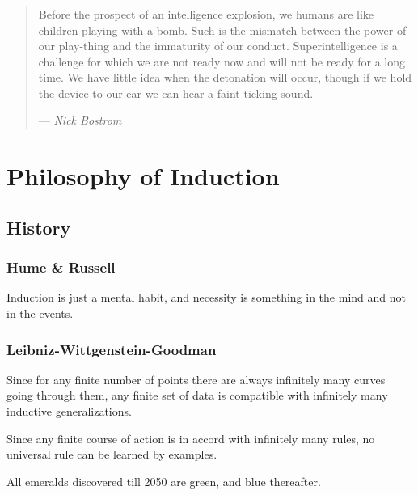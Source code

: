\documentclass[UTF8,11pt,colorlinks,compress,openany]{beamer}%
\begin{document}
\begin{frame}\frametitle{}
\begin{quote}
Before the prospect of an intelligence explosion, we humans are like children playing with a bomb.
Such is the mismatch between the power of our
play-thing and the immaturity of our conduct.
Superintelligence is a challenge for which we are not ready now and will not be ready for a long time. We have little idea when the detonation will occur, though if we hold the device to our ear we can hear a faint ticking sound.\par\hfill --- \textsl{Nick Bostrom}
\end{quote}
\end{frame}

\section{Philosophy of Induction}

\subsection{History}

\begin{frame}\frametitle{Hume \& Russell}
	\begin{proposition}[Hume]
		Induction is just a mental habit, and necessity is something in the mind and not in the events.
	\end{proposition}
		\begin{figure}[H]
		\end{figure}
\end{frame}

\begin{frame}\frametitle{Leibniz-Wittgenstein-Goodman}
	\begin{proposition}[Leibniz]
		Since for any finite number of points there are always infinitely many curves going through them, any finite set of data is compatible with infinitely many inductive generalizations. 
	\end{proposition}
	\begin{proposition}[Wittgenstein]
		Since any finite course of action is in accord with infinitely many rules, no universal rule can be learned by examples.
	\end{proposition}
	\begin{proposition}[Goodman]
		All emeralds discovered till 2050 are green, and blue thereafter. 
	\end{proposition}
\end{frame}
\end{document}
